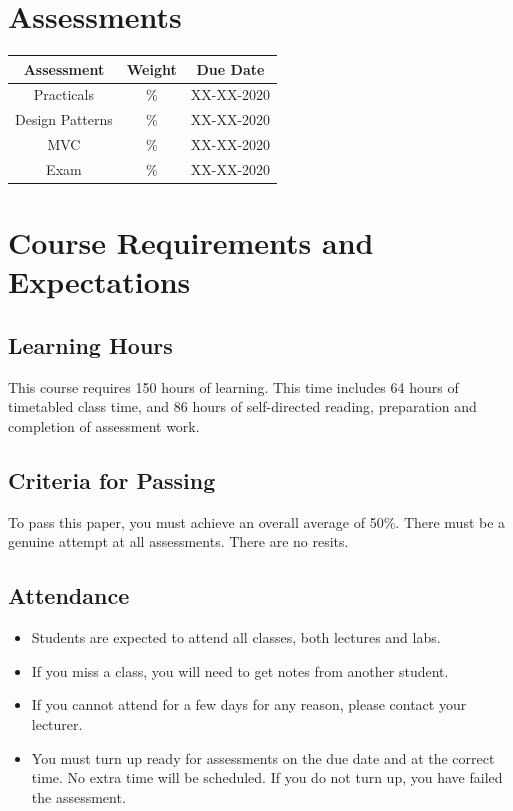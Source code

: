 \documentclass{article}
\begin{document}
\section*{Assessments}
\renewcommand{\arraystretch}{1.5}
\begin{tabular}{|c|c|c|}
	\hline
	\textbf{Assessment} & \textbf{Weight} & \textbf{Due Date} \\ \hline
	Practicals          & \%              & XX-XX-2020        \\ \hline
	Design Patterns     & \%              & XX-XX-2020        \\ \hline
	MVC                 & \%              & XX-XX-2020        \\ \hline
	Exam                & \%              & XX-XX-2020        \\ \hline
\end{tabular}

\section*{Course Requirements and Expectations}

\subsection*{Learning Hours}
This course requires 150 hours of learning. This time includes 64 hours of timetabled class time, and 86 hours of self-directed reading, preparation and completion of assessment work.

\subsection*{Criteria for Passing}
To pass this paper, you must achieve an overall average of 50\%. There must be a genuine attempt at all assessments. There are no resits.

\subsection*{Attendance}
\begin{itemize}
	\item Students are expected to attend all classes, both lectures and labs.
	\item If you miss a class, you will need to get notes from another student.
	\item If you cannot attend for a few days for any reason, please contact your lecturer.
	\item You must turn up ready for assessments on the due date and at the correct time. No extra time will be scheduled. If you do not turn up, you have failed the assessment.
\end{itemize}
\end{document}
